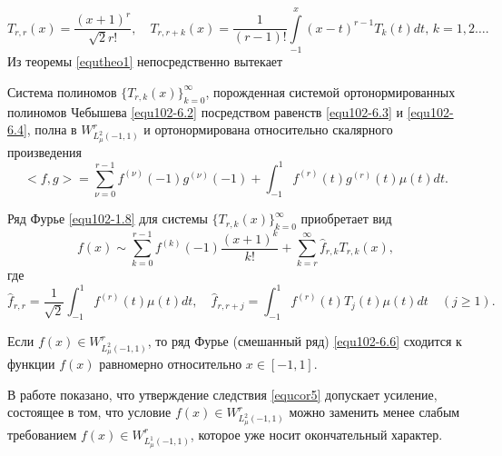   \begin{equation}\label{equ102-6.4}
 T_{r,r}(x) =\frac{(x+1)^r}{\sqrt{2}r!},\quad T_{r,r+k}(x) =\frac{1}{(r-1)!}\int\limits_{-1}^x(x-t)^{r-1}T_k(t)dt, \, k=1,2\ldots.
\end{equation}
Из теоремы \ref{equtheo1} непосредственно вытекает
\begin{corollary}\label{equcor5}
  Система полиномов $\{T_{r,k}(x)\}_{k=0}^\infty$, порожденная системой ортонормированных полиномов Чебышева \eqref{equ102-6.2} посредством равенств \eqref{equ102-6.3} и \eqref{equ102-6.4}, полна  в $W^r_{L^2_\mu(-1,1)}$ и ортонормирована относительно скалярного произведения
\begin{equation}\label{equ102-6.5}
<f,g>=\sum_{\nu=0}^{r-1}f^{(\nu)}(-1)g^{(\nu)}(-1)+\int_{-1}^{1} f^{(r)}(t)g^{(r)}(t)\mu(t) dt.
\end{equation}
\end{corollary}

Ряд Фурье \eqref{equ102-1.8} для системы   $\{T_{r,k}(x)\}_{k=0}^\infty$ приобретает вид
\begin{equation}\label{equ102-6.6}
f(x)\sim \sum_{k=0}^{r-1} f^{(k)}(-1)\frac{(x+1)^k}{k!}+ \sum_{k=r}^\infty \hat f_{r,k}T_{r,k}(x),
\end{equation}
где
  \begin{equation}\label{equ102-6.7}
\hat f_{r,r}=\frac{1}{\sqrt{2}}\int_{-1}^1 f^{(r)}(t)\mu(t)dt,\quad \hat f_{r,r+j}=\int_{-1}^1 f^{(r)}(t)T_{j}(t)\mu(t)dt\quad(j\ge1).
\end{equation}

\begin{corollary}\label{equcor6}
 Если $f(x)\in W^r_{L^2_\mu(-1,1)}$, то ряд Фурье (смешанный ряд) \eqref{equ102-6.6} сходится к функции $f(x)$ равномерно относительно $x\in[-1,1]$.
\end{corollary}

\begin{remark}
В работе \cite{Shar20} показано, что утверждение следствия \ref{equcor5} допускает  усиление, состоящее в том, что  условие $f(x)\in W^r_{L^2_\mu(-1,1)}$ можно заменить менее слабым требованием $f(x)\in W^r_{L^1_\mu(-1,1)}$, которое уже носит окончательный характер.
\end{remark}

